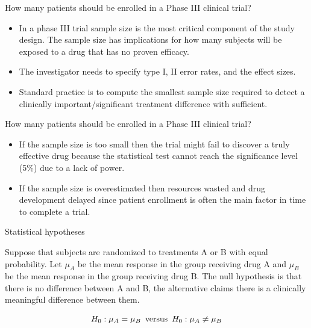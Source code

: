 \documentclass[ignorenonframetext,]{beamer}
\providecommand{\tightlist}{%
\setlength{\itemsep}{0pt}\setlength{\parskip}{0pt}}
\begin{document}
\begin{frame}{How many patients should be enrolled in a Phase III
clinical trial?}

\begin{itemize}
\tightlist
\item
  In a phase III trial sample size is the most critical component of the
  study design. The sample size has implications for how many subjects
  will be exposed to a drug that has no proven efficacy.
\item
  The investigator needs to specify type I, II error rates, and the
  effect sizes.
\item
  Standard practice is to compute the smallest sample size required to
  detect a clinically important/significant treatment difference with
  sufficient.
\end{itemize}

\end{frame}

\begin{frame}{How many patients should be enrolled in a Phase III
clinical trial?}

\begin{itemize}
\tightlist
\item
  If the sample size is too small then the trial might fail to discover
  a truly effective drug because the statistical test cannot reach the
  significance level (5\%) due to a lack of power.
\item
  If the sample size is overestimated then resources wasted and drug
  development delayed since patient enrollment is often the main factor
  in time to complete a trial.
\end{itemize}

\end{frame}

\begin{frame}{Statistical hypotheses}

Suppose that subjects are randomized to treatments A or B with equal
probability. Let \(\mu_A\) be the mean response in the group receiving
drug A and \(\mu_B\) be the mean response in the group receiving drug B.
The null hypothesis is that there is no difference between A and B, the
alternative claims there is a clinically meaningful difference between
them.

\[H_0:\mu_A=\mu_B \thinspace \text{ versus } \thinspace H_0:\mu_A \ne \mu_B \]

\end{frame}
\end{document}
